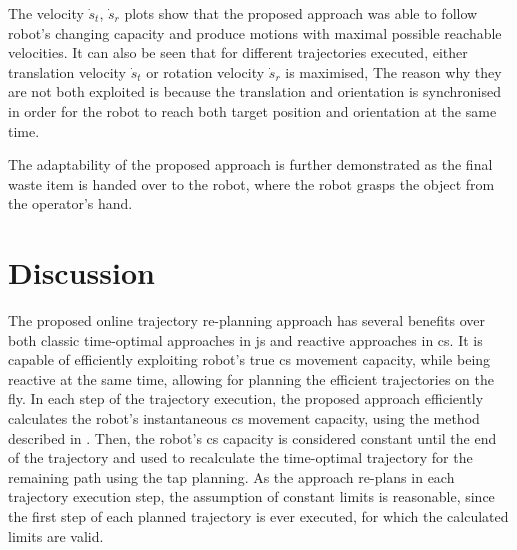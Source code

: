 The velocity $\dot{s}_t$, $\dot{s}_r$ plots show that the proposed approach was able to follow robot's changing capacity and produce motions with maximal possible reachable velocities. It can also be seen that for different trajectories executed, either translation velocity $\dot{s}_t$ or rotation velocity $\dot{s}_r$ is maximised, The reason why they are not both exploited is because the translation and orientation is synchronised in order for the robot to reach both target position and orientation at the same time.

The adaptability of the proposed approach is further demonstrated as the final waste item is handed over to the robot, where the robot grasps the object from the operator's hand. 




\section{Discussion}
\label{ch:topca_discussion}

The proposed online trajectory re-planning approach has several benefits over both classic time-optimal approaches in \gls{js} and reactive approaches in \gls{cs}. It is capable of efficiently exploiting robot's true \gls{cs} movement capacity, while being reactive at the same time, allowing for planning the efficient trajectories on the fly. 
In each step of the trajectory execution, the proposed approach efficiently calculates the robot's instantaneous \gls{cs} movement capacity, using the method described in . Then, the robot's \gls{cs} capacity is considered constant until the end of the trajectory and used to recalculate the time-optimal trajectory for the remaining path using the \gls{tap} planning. As the approach re-plans in each trajectory execution step, the assumption of constant limits is reasonable, since the first step of each planned trajectory is ever executed, for which the calculated limits are valid. 

